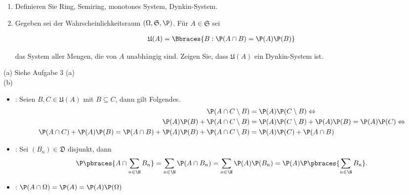 
\begin{exercise}

\phantom{}

\begin{enumerate}[label = (\alph*)]

  \item
  Definieren Sie Ring, Semiring, monotones System, Dynkin-System.
  
  \item
  Gegeben sei der Wahrscheinlichkeitsraum $(\Omega, \mathfrak{S}, \P)$. Für $A \in \mathfrak{S}$ sei
  
  \begin{align*}
    \mathfrak{U}(A) = \Bbraces{B: \P(A \cap B) = \P(A) \P(B)}
  \end{align*}
  
  das System aller Mengen, die von $A$ unabhängig sind. Zeigen Sie, dass $\mathfrak{U}(A)$ ein Dynkin-System ist.

\end{enumerate}

\end{exercise}


\begin{solution}

(a) Siehe Aufgabe 3 (a) \\

(b)

\begin{itemize}

  \item {}: Seien $B, C \in \mathfrak{U}(A)$ mit $B \subseteq C$, dann gilt Folgendes.
  \begin{align*}
    \P(A \cap C \setminus B)
    & = \P(A) \P(C \setminus B)
    \Leftrightarrow \\
    \P(A) \P(B) + \P(A \cap C \setminus B)
    & = \P(A) \P(C \setminus B) + \P(A) \P(B)
      = \P(A) \P(C)
    \Leftrightarrow \\
    \P(A \cap C) + \P(A) \P(B)
      =\P(A \cap B) + \P(A) \P(B) + \P(A \cap C \setminus B)
    & = \P(A) \P(C) + \P(A \cap B)
  \end{align*}

  \item {}: Sei $(B_n) \in \mathfrak{D}$ disjunkt, dann
  \begin{align*}
    \P \pbraces{A \cap \sum_{n \in \N} B_n}
    =
    \sum_{n \in \N} \P(A \cap B_n)
    =
    \sum_{n \in \N} \P(A) \P(B_n)
    =
    \P(A) \P \pbraces{\sum_{n \in \N} B_n}.
  \end{align*}

  \item {}: $\P(A \cap \Omega) = \P(A) = \P(A) \P(\Omega)$

\end{itemize}

\end{solution}

